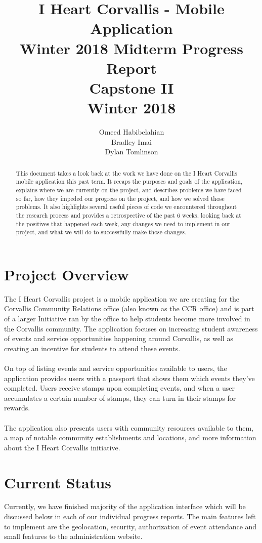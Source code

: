 \documentclass[draftclsnofoot, onecolumn, 10pt, compsoc]{IEEEtran}
\title{\textbf{I Heart Corvallis - Mobile Application
               \\Winter 2018 Midterm Progress Report}
               \\Capstone II
               \\Winter 2018}
\author{Omeed Habibelahian\\Bradley Imai\\Dylan Tomlinson}
\begin{document}
   \maketitle
   \begin{abstract}
      This document takes a look back at the work we have done on the I Heart Corvallis mobile application this past term. It recaps the purposes and goals of the application, explains where we are currently on the project, and describes problems we have faced so far, how they impeded our progress on the project, and how we solved those problems. It also highlights several useful pieces of code we encountered throughout the research process and provides a retrospective of the past 6 weeks, looking back at the positives that happened each week, any changes we need to implement in our project, and what we will do to successfully make those changes.
   \end{abstract}
   \newpage

   \tableofcontents
   \newpage

   \section{Project Overview}
      The I Heart Corvallis project is a mobile application we are creating for the Corvallis Community Relations office (also known as the CCR office) and is part of a larger Initiative ran by the office to help students become more involved in the Corvallis community. The application focuses on increasing student awareness of events and service opportunities happening around Corvallis, as well as creating an incentive for students to attend these events. \\ \\
      On top of listing events and service opportunities available to users, the application provides users with a passport that shows them which events they’ve completed. Users receive stamps upon completing events, and when a user accumulates a certain number of stamps, they can turn in their stamps for rewards. \\ \\
      The application also presents users with community resources available to them, a map of notable community establishments and locations, and more information about the I Heart Corvallis initiative.

   \section{Current Status}
      Currently, we have finished majority of the application interface which will be discussed below in each of our individual progress reports. The main features left to implement are the geolocation, security, authorization of event attendance and small features to the administration website.
\end{document}
